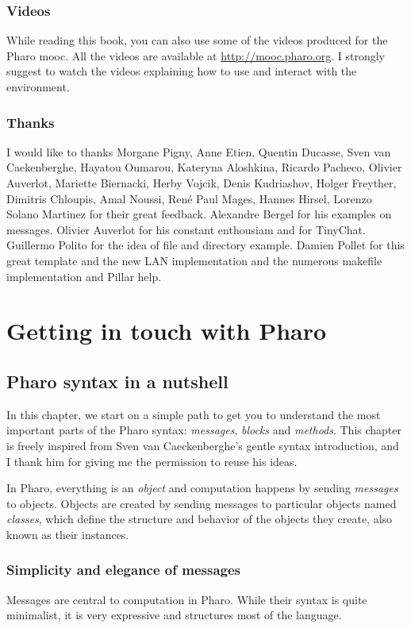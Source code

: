 \documentclass[10pt,twoside,english]{_support/latex/sbabook/sbabook}
\begin{document}
\section{Videos }
While reading this book, you can also use some of the videos produced for the Pharo mooc. All the videos are available at \url{http://mooc.pharo.org}.
I strongly suggest to watch the videos explaining how to use and interact with the environment. 
\section{Thanks}
I would like to thanks Morgane Pigny, Anne Etien, Quentin Ducasse, Sven van Caekenberghe, Hayatou Oumarou, Kateryna Aloshkina, Ricardo Pacheco, Olivier Auverlot, Mariette Biernacki, Herby Vojcik, Denis Kudriashov, Holger Freyther, Dimitris Chloupis, Amal Noussi, Ren\'{e} Paul Mages, Hannes Hirsel, Lorenzo Solano Martinez for their great feedback.
Alexandre Bergel for his examples on messages. Olivier Auverlot for his constant enthousiam and for TinyChat. Guillermo Polito for the idea of file and directory example. Damien Pollet for this great template and the new LAN implementation and the numerous makefile implementation and Pillar help.

\part{Getting in touch with Pharo}\chapter{Pharo syntax in a nutshell}\label{cha:syntax}
In this chapter, we start on a simple path to get you to understand the most important parts of the Pharo syntax: \textit{messages}, \textit{blocks} and \textit{methods}.
This chapter is freely inspired from Sven van Caeckenberghe's gentle syntax introduction, and I thank him for giving me the permission to reuse his ideas.

In Pharo, everything is an \textit{object} and computation happens by sending \textit{messages} to objects.
Objects are created by sending messages to particular objects named \textit{classes}, which define the structure and behavior of the objects they create, also known as their instances.
\section{Simplicity and elegance of messages}
Messages are central to computation in Pharo.
While their syntax is quite minimalist, it is very expressive and structures most of the language.
\end{document}
